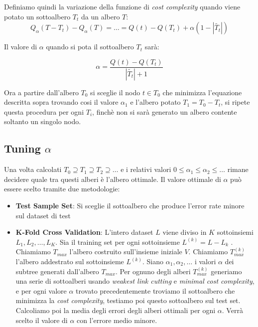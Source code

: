 \documentclass{article}
\begin{document}
    Definiamo quindi la variazione della funzione di 
    \textit{cost complexity} quando viene potato un 
    sottoalbero $T_t$ da un albero $T$:
    \[
          Q_\alpha(T - T_t) - Q_\alpha(T) = \ldots = 
           Q(t) - Q(T_t) + \alpha(1 - |\tilde{T_t}|)
    \]
        

    Il valore di $\alpha$ quando si pota il sottoalbero $T_t$ sarà:

    \[
        \alpha =  \frac{Q(t) - Q(T_t)}{|\tilde{T_t}|   + 1}
    \]

    Ora a partire dall'albero $T_0$ si sceglie il nodo $t \in T_0$ che minimizza
    l'equazione descritta sopra trovando cosi il valore $\alpha_1$ e l'albero potato
    $T_1 = T_0 - T_t$, si ripete questa procedura per ogni $T_i$, finchè non si sarà
    generato un albero contente soltanto un singolo nodo.

    \subsection{Tuning $\alpha$}
    Una volta calcolati $T_0 \supseteq T_1 \supseteq T_2 \supseteq \ldots$ e i relativi
    valori $0 \leq \alpha_1 \leq \alpha_2 \leq \ldots$ rimane decidere 
    quale tra questi alberi è l'albero ottimale. Il valore ottimale di $\alpha$ può essere scelto
    tramite due metodologie:
    \begin{itemize}
        \item \textbf{Test Sample Set}: Si sceglie il sottoalbero che produce l'error rate 
        minore sul dataset di test
        \item \textbf{K-Fold Cross Validation}:
        L'intero dataset $L$ viene diviso in $K$ sottoinsiemi $L_1,L_2,\ldots, L_K$.
        Sia il training set per ogni sottoinsieme $L^{(k)} = L - L_k$ . Chiamiamo $T_{max}$
        l'albero costruito sull'insieme iniziale $V$. Chiamiamo $T_{max}^{(k)}$ l'albero
        addestrato sul sottoinsieme $L^{(k)}$.
        Siano $\alpha_1, \alpha_2, \ldots$ i valori $\alpha$ dei subtree generati 
        dall'albero $T_{max}$.
        Per ognuno degli alberi $T_{max}^{(k)}$ generiamo una serie di sottoalberi 
        usando \textit{weakest link cutting} e \textit{minimal cost complexity}, e per 
        ogni valore $\alpha$ trovato precedentemente troviamo il sottoalbero che minimizza
        la \textit{cost complexity}, testiamo poi questo sottoalbero sul test set.
        Calcoliamo poi la media degli errori degli alberi ottimali per ogni $\alpha$.
        Verrà scelto il valore di $\alpha$ con l'errore medio minore.
    
    \end{itemize}
    \newpage
\end{document}
